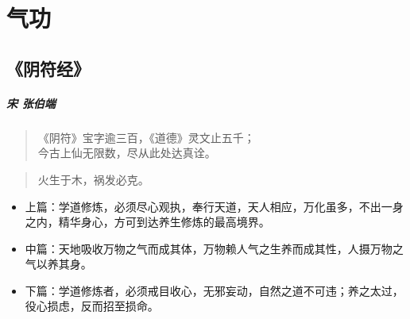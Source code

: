 \chapter{气功}

\section{《阴符经》}

\paragraph{宋 张伯端}
\begin{quote}
《阴符》宝字逾三百，《道德》灵文止五千；\\
今古上仙无限数，尽从此处达真诠。
\end{quote}

\begin{quote}
  火生于木，祸发必克。
\end{quote}

\begin{itemize}
  \item 上篇：学道修炼，必须尽心观执，奉行天道，天人相应，万化虽多，不出一身之内，精华身心，方可到达养生修炼的最高境界。
  \item 中篇：天地吸收万物之气而成其体，万物赖人气之生养而成其性，人摄万物之气以养其身。
  \item 下篇：学道修炼者，必须戒目收心，无邪妄动，自然之道不可违；养之太过，役心损虑，反而招至损命。
\end{itemize}
